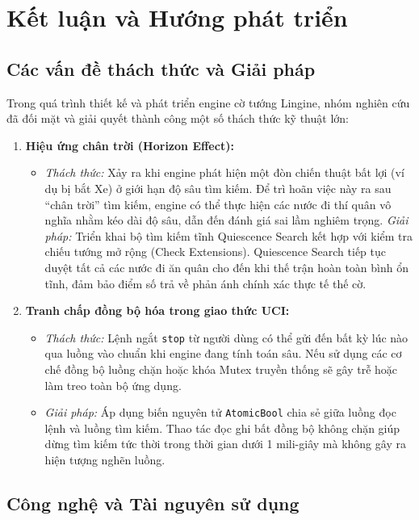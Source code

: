 \chapter{Kết luận và Hướng phát triển}

\section{Các vấn đề thách thức và Giải pháp}

Trong quá trình thiết kế và phát triển engine cờ tướng Lingine, nhóm nghiên cứu đã đối mặt và giải quyết thành công một số thách thức kỹ thuật lớn:

\begin{enumerate}
    \item \textbf{Hiệu ứng chân trời (Horizon Effect):}
    \begin{itemize}
        \item \textit{Thách thức:} Xảy ra khi engine phát hiện một đòn chiến thuật bất lợi (ví dụ bị bắt Xe) ở giới hạn độ sâu tìm kiếm. Để trì hoãn việc này ra sau ``chân trời'' tìm kiếm, engine có thể thực hiện các nước đi thí quân vô nghĩa nhằm kéo dài độ sâu, dẫn đến đánh giá sai lầm nghiêm trọng.
        \textit{Giải pháp:} Triển khai bộ tìm kiếm tĩnh Quiescence Search kết hợp với kiểm tra chiếu tướng mở rộng (Check Extensions). Quiescence Search tiếp tục duyệt tất cả các nước đi ăn quân cho đến khi thế trận hoàn toàn bình ổn tĩnh, đảm bảo điểm số trả về phản ánh chính xác thực tế thế cờ.
    \end{itemize}
    \item \textbf{Tranh chấp đồng bộ hóa trong giao thức UCI:}
    \begin{itemize}
        \item \textit{Thách thức:} Lệnh ngắt \texttt{stop} từ người dùng có thể gửi đến bất kỳ lúc nào qua luồng vào chuẩn khi engine đang tính toán sâu. Nếu sử dụng các cơ chế đồng bộ luồng chặn hoặc khóa Mutex truyền thống sẽ gây trễ hoặc làm treo toàn bộ ứng dụng.
        \item \textit{Giải pháp:} Áp dụng biến nguyên tử \texttt{AtomicBool} chia sẻ giữa luồng đọc lệnh và luồng tìm kiếm. Thao tác đọc ghi bất đồng bộ không chặn giúp dừng tìm kiếm tức thời trong thời gian dưới 1 mili-giây mà không gây ra hiện tượng nghẽn luồng.
    \end{itemize}
\end{enumerate}

\section{Công nghệ và Tài nguyên sử dụng}

